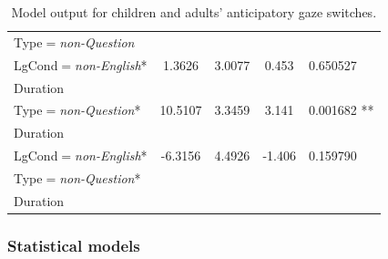 \documentclass[authoryear, 12pt]{elsarticle}
\begin{document}
\begin{table}[h!]
\begin{center}
\begin{tabular}{lcccl}
    Type$=$\textit{non-Question} &&&& \\
    LgCond$=$\textit{non-English}* &        1.3626 &    3.0077 &  0.453 & 0.650527     \\
    Duration &&&& \\
    Type$=$\textit{non-Question}*          &  10.5107 &    3.3459 &  3.141 & 0.001682  ** \\
    Duration &&&& \\
    LgCond$=$\textit{non-English}* & -6.3156 &    4.4926 & -1.406 & 0.159790 \\    
    Type$=$\textit{non-Question}* &&&& \\
    Duration &&&& \\
    \hline
  \end{tabular}
\end{center}
  \caption{Model output for children and adults' anticipatory gaze switches.}
\label{tab:E1-models}
\end{table}

\subsubsection{Statistical models}
\label{sec:models1}
\end{document}
